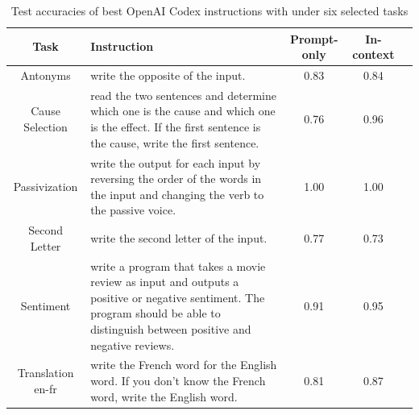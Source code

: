 \begin{table}[H]
\caption{Test accuracies of best OpenAI Codex instructions with \algname under six selected tasks}
\label{tab:codex_instructions}
\begin{center}
\begin{tabular}{cm{7cm}ccc}
\toprule
\textbf{Task} & \textbf{Instruction} & \textbf{Prompt-only} & \textbf{In-context}  \\
\midrule
Antonyms & write the opposite of the input. & 0.83 & 0.84 \\
\midrule
Cause Selection & read the two sentences and determine which one is the cause and which one is the effect. If the first sentence is the cause, write the first sentence. & 0.76 & 0.96 \\
\midrule
Passivization & write the output for each input by reversing the order of the words in the input and changing the verb to the passive voice. & 1.00 & 1.00 \\
\midrule
Second Letter & write the second letter of the input. & 0.77 & 0.73  \\
\midrule
Sentiment & write a program that takes a movie review as input and outputs a positive or negative sentiment. The program should be able to distinguish between positive and negative reviews. & 0.91 & 0.95  \\
\midrule
Translation en-fr & write the French word for the English word. If you don't know the French word, write the English word. & 0.81 & 0.87 \\
\bottomrule
\end{tabular}
\end{center}
\end{table}






